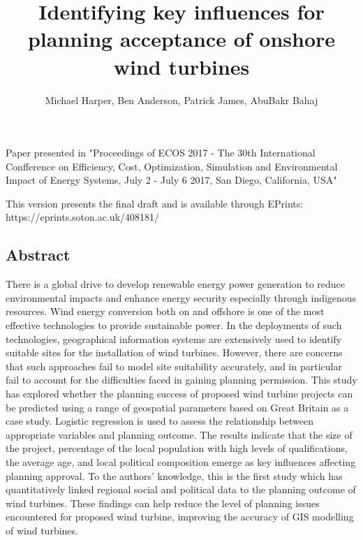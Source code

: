 \documentclass[a4paper,]{article}
\title{Identifying key influences for planning acceptance of onshore wind
turbines}
\author{Michael Harper, Ben Anderson, Patrick James, AbuBakr Bahaj}
\date{}
\theoremstyle{definition}
\theoremstyle{definition}
\theoremstyle{remark}
\begin{document}
\maketitle

{\selectfont
  \renewcommand{\encodingdefault}{T1}
  \renewcommand{\rmdefault}{cmss}

\begin{mdframed}[backgroundcolor=black!5] 
Paper presented in "Proceedings of ECOS 2017 - The 30th International Confference on Efficiency, Cost, Optimization, Simulation and Environmental Impact of Energy Systems, July 2 - July 6 2017, San Diego, California, USA"

This version presents the final draft and is available through EPrints: https://eprints.soton.ac.uk/408181/
\end{mdframed}

\subsection*{Abstract}\label{abstract}

There is a global drive to develop renewable energy power generation to
reduce environmental impacts and enhance energy security especially
through indigenous resources. Wind energy conversion both on and
offshore is one of the most effective technologies to provide
sustainable power. In the deployments of such technologies, geographical
information systems are extensively used to identify suitable sites for
the installation of wind turbines. However, there are concerns that such
approaches fail to model site suitability accurately, and in particular
fail to account for the difficulties faced in gaining planning
permission. This study has explored whether the planning success of
proposed wind turbine projects can be predicted using a range of
geospatial parameters based on Great Britain as a case study. Logistic
regression is used to assess the relationship between appropriate
variables and planning outcome. The results indicate that the size of
the project, percentage of the local population with high levels of
qualifications, the average age, and local political composition emerge
as key influences affecting planning approval. To the authors'
knowledge, this is the first study which has quantitatively linked
regional social and political data to the planning outcome of wind
turbines. These findings can help reduce the level of planning issues
encountered for proposed wind turbine, improving the accuracy of GIS
modelling of wind turbines.

}
\end{document}

